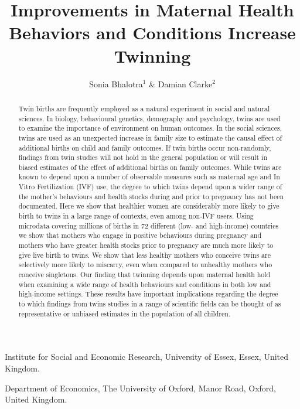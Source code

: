 \documentclass{nature}
\title{Improvements in Maternal Health Behaviors and Conditions Increase Twinning}
\author{Sonia Bhalotra$^{1}$ \& Damian Clarke$^2$}
\begin{document}
\maketitle

\begin{affiliations}
 \item Institute for Social and Economic Research, University of Essex, Essex, United Kingdom.
 \item Department of Economics, The University of Oxford, Manor Road, Oxford, United Kingdom.
\end{affiliations}

\begin{linenumbers}
\begin{abstract}
Twin births are frequently employed as a natural experiment in social and natural sciences\cite{Boomsmaetal2002,Poldermanetal2015}.  In biology, behavioural genetics, demography and psychology, twins are used to examine the importance of environment on human outcomes\cite{Boomsmaetal2002,Poldermanetal2015,Phillips1993,BouchardPropping1993,McClearnetal1997,Nisen2013}. In the social sciences, twins are used as an unexpected increase in family size to estimate the causal effect of additional births on child and family outcomes\cite{WolpinRosenzweig2000,RosenzweigWolpin1980,AngristEvans1988}.  If twin births occur non-randomly, findings from twin studies will not hold in the general population or will result in biased estimates of the effect of additional births on family outcomes.  While twins are known to depend upon a number of observable measures such as maternal age and In Vitro Fertilization (IVF) use\cite{Hall2003,Hoekstraetal2008,Vitthalaetal2009}, the degree to which twins depend upon a wider range of the mother's behaviours and health stocks during and prior to pregnancy has not been documented.  Here we show that healthier women are considerably more likely to give birth to twins in a large range of contexts, even among non-IVF users.  Using microdata covering millions of births in 72 different (low- and high-income) countries we show that mothers who engage in positive behaviours during pregnancy and mothers who have greater health stocks prior to pregnancy are much more likely to give live birth to twins. We show that less healthy mothers who conceive twins are selectively more likely to miscarry, even when compared to unhealthy mothers who conceive singletons.  Our finding that twinning depends upon maternal health hold when examining a wide range of health behaviours and conditions in both low and high-income settings.  These results have important implications regarding the degree to which findings from twins studies in a range of scientific fields can be thought of as representative or unbiased estimates in the population of all children.
\end{abstract}


\end{linenumbers}
\end{document}
